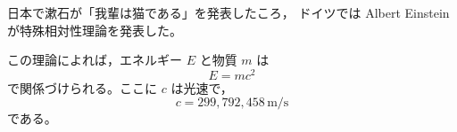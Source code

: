 \documentclass{jsarticle}
\begin{document}
日本で漱石が「我輩は猫である」を発表したころ，
ドイツでは Albert Einstein が特殊相対性理論を発表した。

この理論によれば，エネルギー $E$ と物質 $m$ は
\begin{equation}
  E = mc^{2}
\end{equation}
で関係づけられる。ここに $c$ は光速で，
\begin{equation}
  c = 299{,}792{,}458 \, \mathrm{m/s}
\end{equation}
である。
\end{document}
